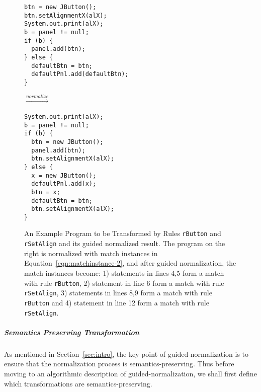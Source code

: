 \documentclass[letterpaper, USenglish]{lipics-v2016}
\newenvironment{smpage}[1]
{\begin{lrbox}{\fmbox}\begin{minipage}{#1}}
{\end{minipage}\end{lrbox}\usebox{\fmbox}}
\newcommand{\code}[1]{\texttt{\footnotesize #1}}
\theoremstyle{plain}
\begin{document}
\begin{figure}[ht]
\vspace{-5pt}
\begin{center}
\begin{smpage}{0.34\columnwidth}
\begin{lstlisting}[style=patl,frame=none,basicstyle=\ttfamily\scriptsize]
btn = new JButton();
btn.setAlignmentX(alX);
System.out.print(alX);
b = panel != null;
if (b) {
  panel.add(btn);
} else {
  defaultBtn = btn;
  defaultPnl.add(defaultBtn);
}
\end{lstlisting}
\end{smpage}
\!\!\!\!\!\!$\xrightarrow{normalize}$~~~~~
\begin{smpage}{0.3\columnwidth}
\begin{lstlisting}[style=patl,frame=none,basicstyle=\ttfamily\scriptsize]
System.out.print(alX);
b = panel != null;
if (b) {
  btn = new JButton();
  panel.add(btn);
  btn.setAlignmentX(alX);
} else {
  x = new JButton();
  defaultPnl.add(x);
  btn = x;
  defaultBtn = btn;
  btn.setAlignmentX(alX);
}
\end{lstlisting}
\end{smpage}
\end{center}
\vspace{-15pt}
\caption{An Example Program to be Transformed by Rules \code{rButton} and
  \code{rSetAlign} and its guided normalized result. The program on the right is normalized with match instances in Equation~\ref{eqn:matchinstance-2}, and after guided normalization, the match instances become: 1) statements in lines 4,5 form a match with rule \code{rButton}, 2) statement in line 6 form a match with rule \code{rSetAlign}, 3) statements in lines 8,9 form a match with rule \code{rButton} and 4) statement in line 12 form a match with rule \code{rSetAlign}.}
\label{running-eg2-normalize}
\vspace{-10pt}
\end{figure}

\subparagraph*{Semantics Preserving Transformation} As mentioned in Section~\ref{sec:intro}, the key point of guided-normalization is to ensure that the normalization process is semantics-preserving. Thus before moving to an algorithmic description of guided-normalization, we shall first define which transformations are semantics-preserving.
\end{document}
